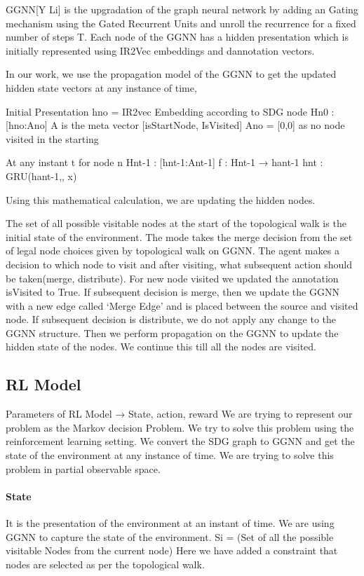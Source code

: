     GGNN[Y Li] is the upgradation of the graph neural network by adding an Gating mechanism using the Gated Recurrent Units  and unroll the recurrence
for a fixed number of steps T. Each node of the GGNN has a hidden presentation which is initially represented using IR2Vec embeddings and dannotation vectors. 

In our work, we use the propagation model of the GGNN to get the updated hidden state vectors at any instance of time, 

Initial Presentation 
hno = IR2vec Embedding according to SDG node   
Hn0 : [hno:Ano]  
A is the meta vector [isStartNode, IsVisited]
Ano  = [0,0]  as no node visited in the starting

At any instant t for node n
Hnt-1 : [hnt-1:Ant-1]
f : Hnt-1 → hant-1 
hnt	 : GRU(hant-1,, x)

Using this mathematical calculation, we are updating the hidden nodes.
 
    The set of all possible visitable nodes at the start of the topological walk is the initial state of the environment. The mode takes the merge decision from the set of legal node choices given by topological walk on GGNN. The agent makes a decision to which node to visit and after visiting, what subsequent action should be taken(merge, distribute). For new node visited we updated the annotation isVisited to True. If subsequent decision is merge, then we update the GGNN with a new edge called ‘Merge Edge’ and is placed  between the source and visited node. If subsequent decision is distribute, we do not apply any change to the GGNN structure. Then we perform propagation on the GGNN to update the hidden state of the nodes. We continue this till all the nodes are visited.

\subsection{RL Model}
Parameters of RL Model → State, action, reward
We are trying to represent our problem as the Markov decision Problem. We try to solve this problem using the reinforcement learning setting. We convert the SDG graph to GGNN and get the state of the environment at any instance of time. We are trying to solve this problem in partial observable space. 

\paragraph{State} It is the presentation of the environment at an instant of time. We are using GGNN to capture the state of the environment.
Si = ({Set of all the possible visitable Nodes from the current node}) 
Here we have added a constraint that nodes are selected as per the topological walk.   

